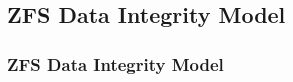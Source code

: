 \subsection{ZFS Data Integrity Model} %
\begin{frame}[fragile]
    \frametitle{ZFS Data Integrity Model}
\end{frame}
% 
% 
% 
% 
% 
% 
% 
% 
% 
% 
% 
% 
% 
% 
% 
% 
% 
% 
% 
% 
% 
% 
% 
% 
% 
% 
% 
% 
% 
% 
% 
